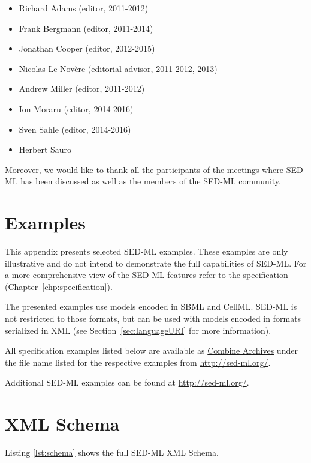 \documentclass[pdftex,rgb,dvipsnames,svgnames,hyperref,table]{report}
\begin{document}
\begin{itemize}
\item Richard Adams (editor, 2011-2012)
\item Frank Bergmann (editor, 2011-2014)
\item Jonathan Cooper (editor, 2012-2015)
\item Nicolas Le Novère (editorial advisor, 2011-2012, 2013)
\item Andrew Miller (editor, 2011-2012)
\item Ion Moraru (editor, 2014-2016)
\item Sven Sahle (editor, 2014-2016)
\item Herbert Sauro
\end{itemize}

Moreover, we would like to thank all the participants of the meetings where SED-ML has been discussed as well as the members of the SED-ML community.


\appendix

\chapter{Examples}
\label{app:examples}
This appendix presents selected SED-ML examples. These examples are only illustrative and do not intend to demonstrate the full capabilities of SED-ML. For a more comprehensive view of the SED-ML features refer to the specification (Chapter~\ref{chp:specification}). 

The presented examples use models encoded in SBML and CellML. SED-ML is not restricted to those formats, but can be used with models encoded in formats serialized in XML (see Section~\ref{sec:languageURI} for more information).

All specification examples listed below are available as \hyperref[sec:archive]{Combine Archives} under the  file name listed for the respective examples from \url{http://sed-ml.org/}. 

Additional SED-ML examples can be found at \url{http://sed-ml.org/}.




\chapter{XML Schema}
\label{app:schema}
Listing \ref{lst:schema} shows the full SED-ML XML Schema.



\end{document}
